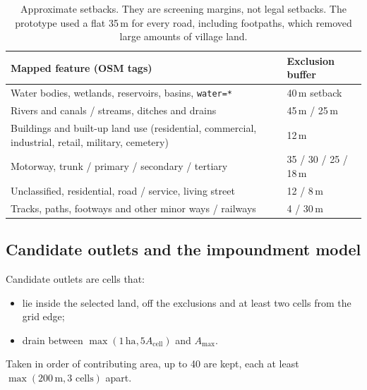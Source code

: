 \documentclass[11pt,a4paper]{article}
\newcommand{\code}[1]{\texttt{#1}}
\begin{document}
\begin{table}[htbp]
\centering\small
\begin{tabularx}{0.9\linewidth}{@{}Yl@{}}
\toprule
\textbf{Mapped feature (OSM tags)} & \textbf{Exclusion buffer}\\
\midrule
Water bodies, wetlands, reservoirs, basins, \code{water=*} & 40\,m setback\\
Rivers and canals / streams, ditches and drains & 45\,m / 25\,m\\
Buildings and built-up land use (residential, commercial, industrial, retail, military, cemetery) & 12\,m\\
Motorway, trunk / primary / secondary / tertiary & 35 / 30 / 25 / 18\,m\\
Unclassified, residential, road / service, living street & 12 / 8\,m\\
Tracks, paths, footways and other minor ways / railways & 4 / 30\,m\\
\bottomrule
\end{tabularx}
\caption{Approximate setbacks. They are screening margins, not legal setbacks. The prototype used a flat 35\,m for every road, including footpaths, which removed large amounts of village land.}
\label{tab:buffers}
\end{table}

\subsection{Candidate outlets and the impoundment model}
Candidate outlets are cells that:
\begin{itemize}
\item lie inside the selected land, off the exclusions and at least two cells from the grid edge;
\item drain between $\max(1\,\text{ha}, 5A_{\mathrm{cell}})$ and $A_{\max}$.
\end{itemize}
Taken in order of contributing area, up to 40 are kept, each at least $\max(200\,\text{m}, 3\text{ cells})$ apart.
\end{document}
